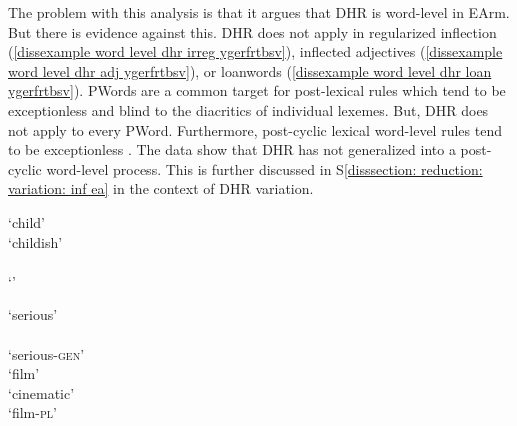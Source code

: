 The problem with this analysis is that it argues that DHR is word-level in EArm. But there is evidence against this.  DHR does not apply in  regularized inflection (\ref{dissexample word level dhr irreg ygerfrtbsv}), inflected adjectives (\ref{dissexample word level dhr adj ygerfrtbsv}), or loanwords (\ref{dissexample word level dhr loan ygerfrtbsv}).   PWords are a common target for post-lexical rules which  tend to be   exceptionless and blind to the  diacritics  of individual lexemes. But, DHR  does not apply to every PWord. Furthermore,  post-cyclic lexical word-level rules  tend  to be exceptionless \citep{Pesetsky-1979-RussianMorphoLexicalTheory}. The   data show  that DHR has not generalized into a post-cyclic word-level process.     This   is further discussed in S\ref{disssection: reduction: variation: inf ea} in the context of DHR variation.  



\begin{exe}
	\ex 
	\begin{multicols}{3}
		\begin{xlist}
			\ex {}`child'\label{dissexample word level dhr irreg ygerfrtbsv}\\
			`childish'\\
			\\
			`'
			
			\ex {}`serious'\label{dissexample word level dhr adj ygerfrtbsv}\\
			\\
			`serious-\textsc{gen}' \\
			
			
			\ex {}`film'\label{dissexample word level dhr loan ygerfrtbsv}\\
			`cinematic'\\
			`film-\textsc{pl}' 
		\end{xlist}
		
	\end{multicols}
	
\end{exe}


